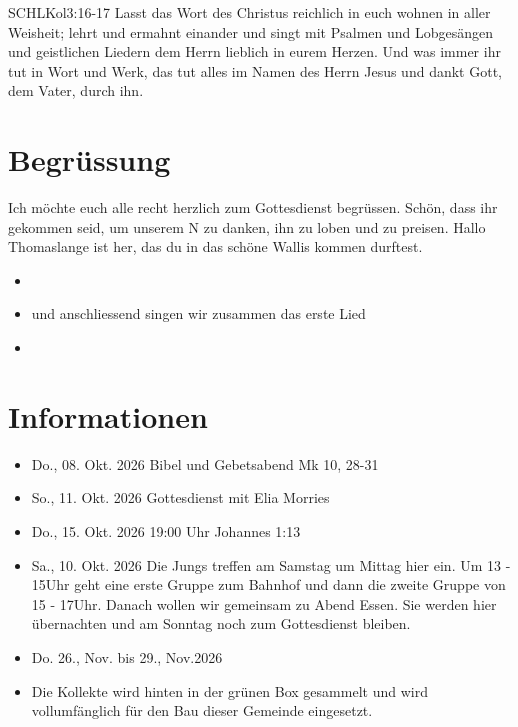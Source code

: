 \documentclass[fontsize=14pt]{mybib}
\author{OTS}
\newcommand{\Name}{Thomas}
\begin{document}
\begin{bibelbox}{SCHL}{Kol}{3:16-17}
    Lasst das Wort des Christus reichlich in euch wohnen in aller Weisheit; lehrt und ermahnt einander und singt mit Psalmen und Lobgesängen und geistlichen Liedern dem Herrn lieblich in eurem Herzen. Und was immer ihr tut in Wort und Werk, das tut alles im Namen des Herrn Jesus und dankt Gott, dem Vater, durch ihn.
\end{bibelbox}
\section{Begrüssung}
Ich möchte euch alle recht herzlich zum Gottesdienst begrüssen. Schön, dass ihr gekommen seid, um unserem \herr N zu danken, ihn zu loben und zu preisen. 
Hallo \Name lange ist her, das du in das schöne Wallis kommen durftest.

\begin{itemize}
    \item {}
    \item und anschliessend singen wir zusammen das erste Lied
    \item {}
\end{itemize}

\section{Informationen}
\begin{itemize}
    \item {} Do., 08. Okt. 2026 Bibel und Gebetsabend Mk 10, 28-31
    \item {} So., 11. Okt. 2026 Gottesdienst  mit Elia Morries
    \item {} Do., 15. Okt. 2026 19:00 Uhr Johannes 1:13
    \item {} Sa., 10. Okt. 2026 Die Jungs treffen am Samstag um Mittag hier ein. Um 13 - 15Uhr geht eine erste Gruppe zum Bahnhof und dann die zweite Gruppe von 15 - 17Uhr. Danach wollen wir gemeinsam zu Abend Essen. Sie werden hier übernachten und am Sonntag noch zum Gottesdienst bleiben.
    \item {} Do. 26., Nov. bis 29., Nov.2026 
    \item {} Die Kollekte wird hinten in der grünen Box gesammelt und wird vollumfänglich für den Bau dieser Gemeinde eingesetzt.
\end{itemize}
\end{document}
